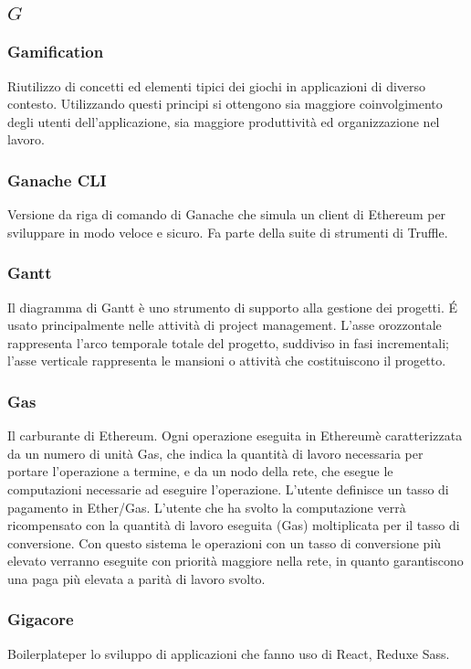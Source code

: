 \subsection*{\quad$G\quad$}
\subsubsection*{Gamification}
Riutilizzo di concetti ed elementi tipici dei giochi in applicazioni di diverso contesto. Utilizzando questi principi si ottengono sia maggiore coinvolgimento degli utenti dell'applicazione, sia maggiore produttività ed organizzazione nel lavoro.

\subsubsection*{Ganache CLI}
Versione da riga di comando di Ganache che simula un client di Ethereum per sviluppare in modo veloce e sicuro. Fa parte della suite di strumenti di Truffle\glo.

\subsubsection*{Gantt}
Il diagramma di Gantt è uno strumento di supporto alla gestione dei progetti. \'E usato principalmente nelle attività di project management. L'asse orozzontale rappresenta l'arco temporale totale del progetto, suddiviso in fasi incrementali; l'asse verticale rappresenta le mansioni o attività che costituiscono il progetto.

\subsubsection*{Gas}
Il carburante di Ethereum. Ogni operazione eseguita in Ethereum\glosp è caratterizzata da un numero di unità Gas, che indica la quantità di lavoro necessaria per portare l'operazione a termine, e da un nodo della rete, che esegue le computazioni necessarie ad eseguire l'operazione. L'utente definisce un tasso di pagamento in Ether\glo/Gas. L'utente che ha svolto la computazione verrà ricompensato con la quantità di lavoro eseguita (Gas) moltiplicata per il tasso di conversione. Con questo sistema le operazioni con un tasso di conversione più elevato verranno eseguite con priorità maggiore nella rete, in quanto garantiscono una paga più elevata a parità di lavoro svolto.  

\subsubsection*{Gigacore}
Boilerplate\glosp per lo sviluppo di applicazioni che fanno uso di React\glo, Redux\glosp e Sass\glo.

